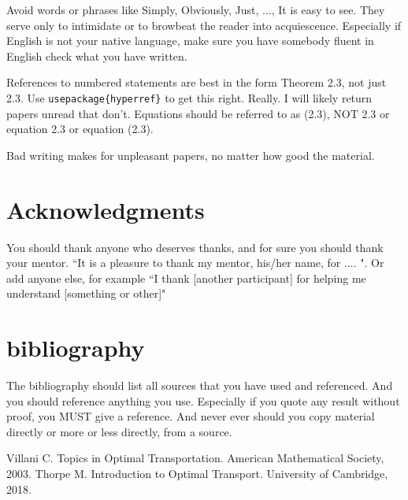 \documentclass[psamsfonts]{amsart}
\theoremstyle{definition}
\numberwithin{equation}{section}
\begin{document}
Avoid words or phrases like Simply, Obviously, Just, ..., It is easy to see.  They serve only to intimidate or to browbeat the reader into acquiescence. 
Especially if English is not your native language, make sure you have  somebody fluent in English check what you have written.     

References to numbered statements are best in the form Theorem 2.3, not just 2.3.  Use  \verb|usepackage{hyperref}| to get this right.  Really.  I will likely return papers unread that don't. 
Equations should be referred to as (2.3), NOT 2.3 or equation 2.3 or equation (2.3).


Bad writing makes for unpleasant papers, no matter how good the material.

\section*{Acknowledgments}  You should thank anyone who deserves thanks, and for sure you should
thank your mentor.   ``It is a pleasure to thank my mentor, 
his/her name, for ....  ".   Or add anyone else, for example ``I thank [another participant] for helping 
me understand [something or other]"

\section{bibliography}  The bibliography should list all sources that you have used and referenced.
And you should reference anything you use.   Especially if you quote any result without proof, you MUST
give a reference.   And never ever should you copy material directly or more or less directly, from a source.

\begin{thebibliography}{9}
Villani C.
Topics in Optimal Transportation.
American Mathematical Society, 2003.
Thorpe M.
Introduction to Optimal Transport.
University of Cambridge, 2018.
\end{thebibliography}
\end{document}
